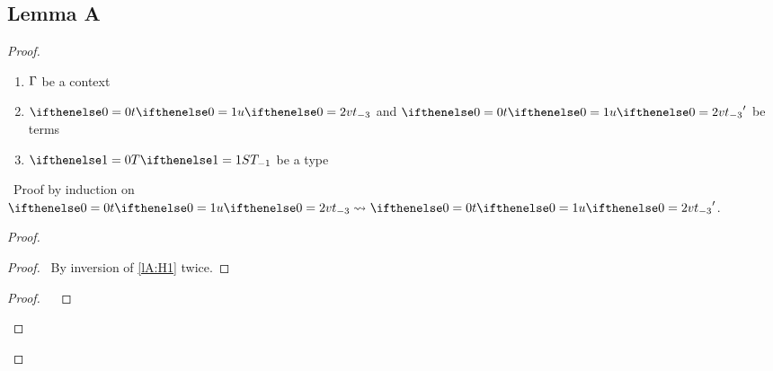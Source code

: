 \documentclass[a4paper]{article}
\begin{document}
\subsection{Lemma A}
\begin{proof}
    \pflet
    {\begin{enumerate}
        \item $\Gamma$ be a context
        \item $\aTerm$ and $\aTerm'$ be terms
        \item $\aType[1]$ be a type
    \end{enumerate}}
    \pfsketch\ Proof by induction on $\simplBeta \aTerm {\aTerm'}$.
    \begin{proof}
        \begin{proof}
            \pf\ By inversion of \ref{lA:H1} twice.
        \end{proof}
        \qedstep
        \begin{proof}
           \pf\ 
                    {\judge {\aContext}
                            {\subs{\aTerm[3]}{\envextend \envid \aVar \aBase}}
                            {\aType}}
                    {}
        \end{proof}
    \end{proof}
\end{proof}
\end{document}
